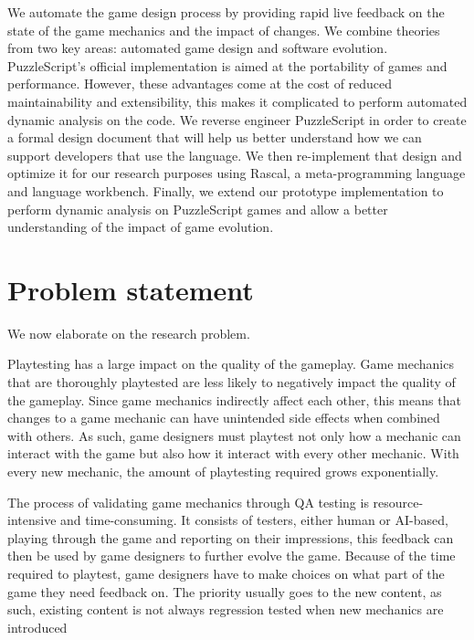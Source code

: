 We automate the game design process by providing rapid live feedback on the state of the game mechanics and the impact of changes. We combine theories from two key areas: automated game design\cite{ostrowski2013automated,cook2020software,cook2017vision,10.1145/3102071.3102084,10.1145/3412843} and software evolution\cite{10.1145/2501543.2501546,1572302}. PuzzleScript's official implementation is aimed at the portability of games and performance. However, these advantages come at the cost of reduced maintainability and extensibility, this makes it complicated to perform automated dynamic analysis on the code. We reverse engineer PuzzleScript in order to create a formal design document that will help us better understand how we can support developers that use the language. We then re-implement that design and optimize it for our research purposes using Rascal, a meta-programming language and language workbench. Finally, we extend our prototype implementation to perform dynamic analysis on PuzzleScript games and allow a better understanding of the impact of game evolution.



\section{Problem statement}
We now elaborate on the research problem. 

Playtesting has a large impact on the quality of the gameplay. Game mechanics that are thoroughly playtested are less likely to negatively impact the quality of the gameplay. Since game mechanics indirectly affect each other, this means that changes to a game mechanic can have unintended side effects when combined with others. As such, game designers must playtest not only how a mechanic can interact with the game but also how it interact with every other mechanic. With every new mechanic, the amount of playtesting required grows exponentially.


The process of validating game mechanics through QA testing is resource-intensive and time-consuming. It consists of testers, either human or AI-based, playing through the game and reporting on their impressions, this feedback can then be used by game designers to further evolve the game. Because of the time required to playtest, game designers have to make choices on what part of the game they need feedback on. The priority usually goes to the new content, as such, existing content is not always regression tested when new mechanics are introduced\cite{ostrowski2013automated} 


